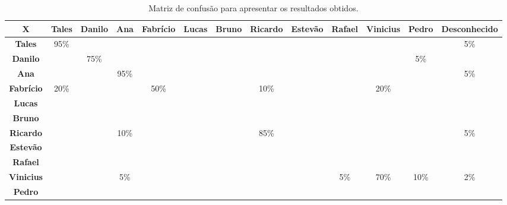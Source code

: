 	\begin{landscape}
	\begin{table}[htb]
		\begin{center}
			\caption{Matriz de confusão para apresentar os resultados obtidos.}
			\label{tab:matriz-confusao}
			\begin{tabular}{|c|c|c|c|c|c|c|c|c|c|c|c|c|}
				\hline \bf X & \bf Tales & \bf Danilo & \bf Ana & \bf Fabrício & \bf Lucas & \bf Bruno & \bf Ricardo & \bf Estevão & \bf Rafael & \bf Vinicius & \bf Pedro & \bf Desconhecido\\
				\hline \bf Tales 		& 95\% & 			& 		 & 			& & & 		 & & 		 & 			& 		 & 5\%\\
				\hline \bf Danilo 	& 		 & 75\% & 		 & 			& & & 		 & & 		 & 			& 5\%  &		\\
				\hline \bf Ana 			& 		 & 			& 95\% & 			& & & 		 & & 		 & 			& 		 & 5\%\\
				\hline \bf Fabrício & 20\% & 			& 		 & 50\% & & & 10\% & & 		 & 20\% & 		 &		\\
				\hline \bf Lucas 		& 		 & 			& 		 & 			& & & 		 & & 		 & 			& 		 &		\\
				\hline \bf Bruno 		& 		 & 			& 		 & 			& & & 		 & & 		 & 			& 		 &		\\
				\hline \bf Ricardo 	& 		 & 			& 10\% & 			& & & 85\% & & 		 & 			& 		 & 5\%\\
				\hline \bf Estevão 	& 		 & 			& 		 & 			& & & 		 & & 		 & 			& 		 &		\\
				\hline \bf Rafael 	& 		 & 			& 		 & 			& & & 		 & & 		 & 			& 		 &		\\
				\hline \bf Vinicius & 		 & 			& 5\%  & 			& & & 		 & & 5\% & 70\% & 10\% & 2\%\\
				\hline \bf Pedro 		& 		 & 			& 		 & 			& & & 		 & & 		 & 			& 		 &		\\
				\hline
			\end{tabular}
		\end{center}
	\end{table}
	\end{landscape}
